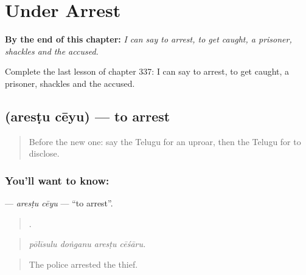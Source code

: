 
\chapter{Under Arrest}
\label{ch:te-under-arrest}

\begin{chapteropening}
\textbf{By the end of this chapter:} \emph{I can say to arrest, to get caught, a prisoner, shackles and the accused.}

Complete the last lesson of chapter 337: I can say to arrest, to get caught, a prisoner, shackles and the accused.
\end{chapteropening}

\section[\texorpdfstring{\te{అరెస్టు} \te{చేయు} (aresṭu cēyu)}{అరెస్టు చేయు (aresṭu cēyu)}]{  (aresṭu cēyu) — to arrest}

\label{lesson:TE-C337-arestu-ceyu}



\begin{quote}
Before the new one: say the Telugu for an uproar, then the Telugu for to disclose.
\end{quote}

\subsection*{You'll want to know:  }
\textbf{ } — \emph{aresṭu cēyu} — \textquotedblleft{}to arrest\textquotedblright{}.

\begin{quote}
   .
\end{quote}

\begin{quote}
\emph{pōlīsulu doṅganu aresṭu cēśāru.}
\end{quote}

\begin{quote}
The police arrested the thief.
\end{quote}


